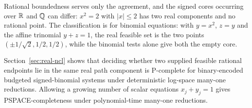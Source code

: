 Rational boundedness serves only the agreement, and the signed cores
occurring over $\mathbb{R}$ and $\mathbb{Q}$ can differ: $x^2=2$ with $|x|\le2$ has two
real components and no rational point. The classification is for binomial
equations: with $y=x^2$, $z=y$ and the affine trinomial $y+z=1$, the real
feasible set is the two points $(\pm1/\sqrt2,1/2,1/2)$, while the binomial
tests alone give both the empty core.

Section~\ref{sec:real-ncl} shows that deciding whether two supplied
feasible rational endpoints lie in the same real path component is
P-complete for binary-encoded budgeted signed-binomial systems under
deterministic log-space many-one reductions. Allowing a growing number of
scalar equations $x_j+y_j=1$ gives PSPACE-completeness under
polynomial-time many-one reductions.
